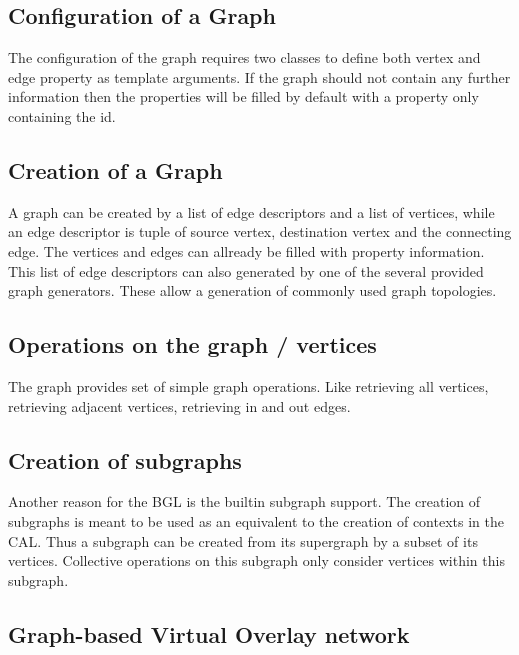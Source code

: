   \subsection{Configuration of a Graph}
    The configuration of the graph requires two classes to define both
    vertex and edge property as template arguments.  If the graph
    should not contain any further information then the properties
    will be filled by default with a property only containing the id.

  \subsection{Creation of a Graph}
    A graph can be created by a list of edge descriptors and a list of
    vertices, while an edge descriptor is tuple of source vertex,
    destination vertex and the connecting edge. The vertices and edges
    can allready be filled with property information.  This list of
    edge descriptors can also generated by one of the several provided
    graph generators. These allow a generation of commonly used graph
    topologies.


  \subsection{Operations on the graph / vertices}
    The graph provides set of simple graph operations. Like retrieving all
    vertices, retrieving adjacent vertices, retrieving in and out
    edges.

  \subsection{Creation of subgraphs}
    Another reason for the BGL is the builtin subgraph support. The
    creation of subgraphs is meant to be used as an equivalent to the
    creation of contexts in the CAL. Thus a subgraph can be created from its
    supergraph by a subset of its vertices. Collective operations on
    this subgraph only consider vertices within this subgraph.

\subsection{Graph-based Virtual Overlay network}

